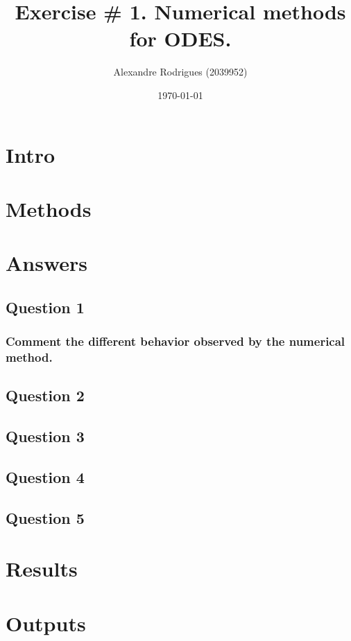 \documentclass[a4paper, 11pt]{article}
\begin{document}
	
	\title{Exercise \# 1. Numerical methods for ODES. }
	\author{{\small Alexandre Rodrigues (2039952)}}
	\date{\today}
	
	\maketitle
	
	\section*{Intro}
	
	\section*{Methods}
	
	
	\section*{Answers}
		\subsection*{Question 1}
			\subsubsection*{ Comment the different behavior observed by the numerical method.}
				
		\subsection*{Question 2}
		
		\subsection*{Question 3}
			
		\subsection*{Question 4}
			
		\subsection*{Question 5}
			
			
			
	
	
	\section*{Results}

	
	\section*{Outputs}
	
	
	
\end{document}
